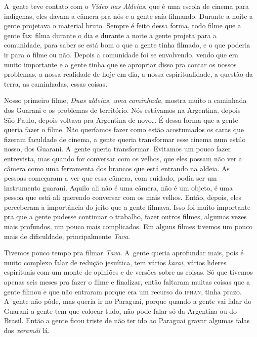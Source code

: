 A~gente teve contato com o \emph{Vídeo nas Aldeias}, que é uma escola de
cinema para indígenas, eles davam a câmera pra nós e a gente saía
filmando. Durante a noite a gente projetava o material bruto. Sempre é
feito dessa forma, todo filme que a gente faz: filma durante o dia e
durante a noite a gente projeta para a comunidade, para saber se está
bom o que a gente tinha filmado, e o que poderia ir para o filme ou não.
Depois a comunidade foi se envolvendo, vendo que era muito importante e
a gente tinha que se apropriar disso pra contar os nossos problemas, a
nossa realidade de hoje em dia, a nossa espiritualidade, a questão da
terra, as caminhadas, essas coisas.

Nosso primeiro filme, \emph{Duas aldeias, uma caminhada}, mostra muito a
caminhada dos Guarani e os problemas de território. Nós estávamos na
Argentina, depois São Paulo, depois voltava pra Argentina de novo\ldots{} É
dessa forma que a gente queria fazer o filme. Não queríamos fazer como
estão acostumados os caras que fizeram faculdade de cinema, a gente
queria transformar esse cinema num estilo nosso, dos Guarani. A~gente
queria transformar. Evitamos um pouco fazer entrevista, mas quando for
conversar com os velhos, que eles possam não ver a câmera como uma
ferramenta dos brancos que está entrando na aldeia. As pessoas começaram
a ver que essa câmera, com cuidado, podia ser um instrumento guarani.
Aquilo ali não é uma câmera, não é um objeto, é uma pessoa que está ali
querendo conversar com os mais velhos. Então, depois, eles perceberam a
importância do jeito que a gente filmava. Isso foi muito importante pra
que a gente pudesse continuar o trabalho, fazer outros filmes, algumas
vezes mais profundos, um pouco mais complicados. Em alguns filmes
tivemos um pouco mais de dificuldade, principalmente \emph{Tava}.

Tivemos pouco tempo pra filmar \emph{Tava}. A~gente queria aprofundar mais,
pois é muito complexo falar de redução jesuítica, tem vários \emph{karai},
vários lideres espirituais com um monte de opiniões e de versões sobre
as coisas. Só que tivemos apenas seis meses pra fazer o filme e
finalizar, então faltaram muitas coisas que a gente filmou e que não
entraram porque era um recurso do \textsc{iphan}, tinha prazo. A~gente não pôde,
mas queria ir no Paraguai, porque quando a gente vai falar do Guarani a
gente tem que colocar tudo, não pode falar só da Argentina ou do
Brasil. Então a gente ficou triste de não ter ido ao Paraguai gravar
algumas falas dos \emph{xeramõi} lá. 

